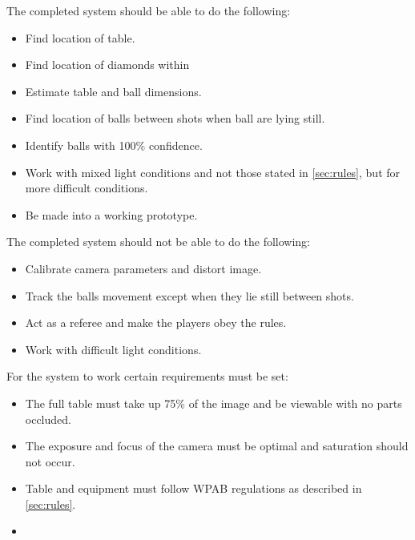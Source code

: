 The completed system should be able to do the following:

\begin{itemize}
	\item Find location of table.
	\item Find location of diamonds within  
	\item Estimate table and ball dimensions.

	\item Find location of balls between shots when ball are lying still.
	\item Identify balls with 100\% confidence. %
	
	\item Work with mixed light conditions and not those stated in \ref{sec:rules}, but for more difficult conditions.
	
	\item Be made into a working prototype.
	
\end{itemize}

The completed system should not be able to do the following:

\begin{itemize}
	\item Calibrate camera parameters and distort image.
	\item Track the balls movement except when they lie still between shots.
	\item Act as a referee and make the players obey the rules.
	\item Work with difficult light conditions.
\end{itemize}
For the system to work certain requirements must be set:

\begin{itemize}
	\item The full table must take up 75\% of the image and  be viewable with no parts occluded.
	\item The exposure and focus of the camera must be optimal and saturation should not occur.
	\item Table and equipment must follow WPAB regulations as described in \ref{sec:rules}.
	\item 
\end{itemize}